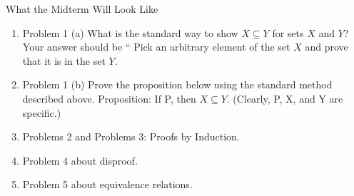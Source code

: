 \documentclass[12pt]{article}
\newcommand{\be}{\begin{enumerate}}
\newcommand{\ee}{\end{enumerate}}
\begin{document}
\begin{center} What the Midterm Will Look Like \end{center}
\be
\item Problem 1 (a) What is the standard way to show $X \subseteq Y$ for sets $X$ and $Y$? Your answer should be `` Pick an arbitrary element of the set $X$ and prove that it is in the set $Y.$
\item Problem 1 (b) Prove the proposition below using the standard method described above.  Proposition: If P, then $X \subseteq Y.$ (Clearly, P, X, and Y are specific.)
\item Problems 2 and Problems 3: Proofs by Induction.
\item Problem 4 about disproof.
\item Problem 5 about equivalence relations.
\ee
\end{document}
